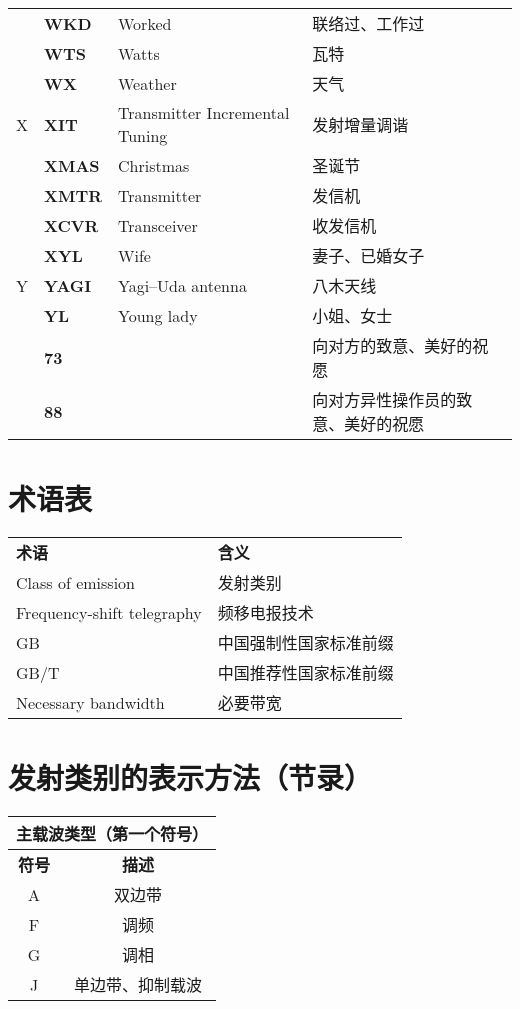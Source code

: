 \begin{longtable}[l]{llll}
& \textbf{WKD} & Worked & 联络过、工作过 \\
& \textbf{WTS} & Watts & 瓦特 \\
& \textbf{WX} & Weather & 天气 \\
X & \textbf{XIT} & Transmitter Incremental Tuning & 发射增量调谐 \\
& \textbf{XMAS} & Christmas & 圣诞节 \\
& \textbf{XMTR} & Transmitter & 发信机 \\
& \textbf{XCVR} & Transceiver & 收发信机 \\
& \textbf{XYL} & Wife & 妻子、已婚女子 \\
Y & \textbf{YAGI} & Yagi–Uda antenna & 八木天线 \\
& \textbf{YL} & Young lady & 小姐、女士 \\
& \textbf{73} & & 向对方的致意、美好的祝愿 \\
& \textbf{88} & & 向对方异性操作员的致意、美好的祝愿 \\
\end{longtable}

\newpage



\section{术语表}

\begin{longtable}[l]{ll}
	\textbf{术语} & \textbf{含义} \\
	Class of emission & 发射类别 \\
	Frequency-shift telegraphy & 频移电报技术\\
	GB & 中国强制性国家标准前缀 \\
	GB/T & 中国推荐性国家标准前缀 \\
	Necessary bandwidth & 必要带宽 \\
\end{longtable}

\newpage



\section{发射类别的表示方法（节录）}

\begin{tabular}{|c|c|}
	\hline
	\multicolumn{2}{|c|}{\textbf{主载波类型（第一个符号）}} \\
	\hline
	\textbf{符号} & \textbf{描述} \\
	\hline
	A & 双边带 \\
	\hline
	F & 调频 \\
	\hline
	G & 调相 \\
	\hline
	J & 单边带、抑制载波 \\
	\hline
\end{tabular}

